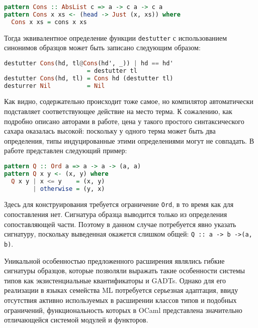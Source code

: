 \noindent
\begin{minipage}{\linewidth}
\begin{lstlisting}[language=haskell]
pattern Cons :: AbsList c => a -> c a -> c a
pattern Cons x xs <- (head -> Just (x, xs)) where
  Cons x xs = cons x xs
\end{lstlisting}
\end{minipage}

Тогда эквивалентное определение функции \lstinline|destutter| с использованием синонимов образцов может быть записано следующим образом:

\noindent
\begin{minipage}{\linewidth}
\begin{lstlisting}[language=haskell]
destutter Cons(hd, tl@Cons(hd', _)) | hd == hd' 
                       = destutter tl
destutter Cons(hd, tl) = Cons hd (destutter tl)
desturrer Nil          = Nil
\end{lstlisting}
\end{minipage}

Как видно, содержательно происходит тоже самое, но компилятор автоматически подставляет соответствующее действие на место терма. К сожалению, как подробно описано авторами в работе, цена у такого простого синтаксического сахара оказалась высокой: поскольку у одного терма может быть два определения, типы индуцированные этими определениями могут не совпадать. В работе представлен следующий пример:

\noindent
\begin{minipage}{\linewidth}
\begin{lstlisting}[language=haskell]
pattern Q :: Ord a => a -> a -> (a, a)
pattern Q x y <- (x, y) where
  Q x y | x <= y    = (x, y)
        | otherwise = (y, x)
\end{lstlisting}
\end{minipage}

Здесь для конструирования требуется ограничение \lstinline|Ord|, в то время как для сопоставления нет. Сигнатура образца выводится только из определения сопоставляющей части. Поэтому в данном случае потребуется явно указать сигнатуру, поскольку выведенная окажется слишком общей: \lstinline|Q :: a -> b ->(a, b)|.

Уникальной особенностью предложенного расширения являлись гибкие сигнатуры образцов, которые позволяли выражать такие особенности системы типов как экзистенциальные квантификаторы и GADTs. Однако для его реализации в языках семейства ML потребуется серьезная адаптация, ввиду отсутствия активно используемых в расширении классов типов и подобных ограничений, функциональность которых в OCaml представлена значительно отличающейся системой модулей и функторов.

